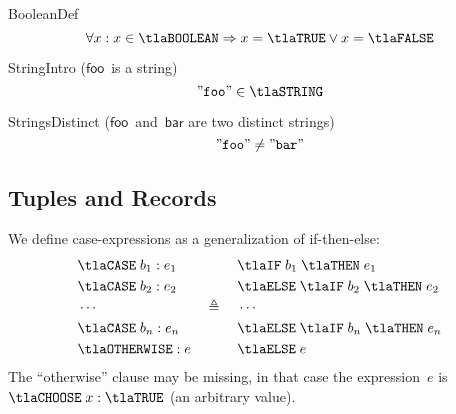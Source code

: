 \documentclass[11pt, a4paper, oneside]{article}
\begin{document}
\begin{axioms}
\item[BooleanDef] \[
        \forall x : x \in \tlaBOOLEAN \imp x = \tlaTRUE \vee x = \tlaFALSE
    \]

\item[StringIntro ({\rm$\mathsf{foo}$~is a string})] \[
        \mkstr{foo} \in \tlaSTRING
    \]

\item[StringsDistinct ({\rm$\mathsf{foo}$~and~$\mathsf{bar}$ are two distinct strings})] \[
        \mathtt{"foo"} \neq \mathtt{"bar"}
    \]

\end{axioms}


    \subsection{Tuples and Records}
    \label{subsec:tups_and_recs}

We define case-expressions as a generalization of if-then-else: \[
    \begin{aligned}
        &\tlaCASE\; b_1 : e_1 \\
        &\tlaCASE\; b_2 : e_2 \\
        &\cdots \\
        &\tlaCASE\; b_n : e_n \\
        &\tlaOTHERWISE : e
    \end{aligned}
    \quad\triangleq\quad
    \begin{aligned}
        &\tlaIF\; b_1 \;\tlaTHEN\; e_1 \\
        &\tlaELSE\;\tlaIF\; b_2 \;\tlaTHEN\; e_2 \\
        &\cdots \\
        &\tlaELSE\;\tlaIF\; b_n \;\tlaTHEN\; e_n \\
        &\tlaELSE\; e
    \end{aligned}
\] The ``otherwise'' clause may be missing, in that case the expression~$e$ is $\tlaCHOOSE\; x : \tlaTRUE$ (an arbitrary value).
\end{document}
